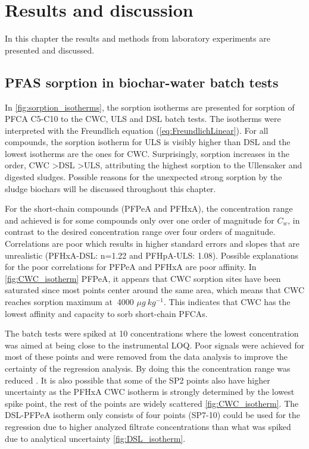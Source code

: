\chapter{Results and discussion}\label{chap:Results&Disc}
In this chapter the results and methods from laboratory experiments are presented and discussed.

\section{PFAS sorption in biochar-water batch tests}
In \cref{fig:sorption_isotherms}, the sorption isotherms are presented for sorption of PFCA C5-C10 to the CWC, ULS and DSL batch tests. The isotherms were interpreted with the Freundlich equation (\cref{eq:FreundlichLinear}). For all compounds, the sorption isotherm for ULS is visibly higher than DSL and the lowest isotherms are the ones for CWC. Surprisingly, sorption increases in the order, CWC \textgreater DSL \textgreater ULS, attributing the highest sorption to the Ullensaker and digested sludges. Possible reasons for the unexpected strong sorption by the sludge biochars will be discussed throughout this chapter. 

For the short-chain compounds (PFPeA and PFHxA), the concentration range and  achieved is for some compounds only over one order of magnitude for $C_w$, in contrast to the desired concentration range over four orders of magnitude. Correlations are poor which results in higher standard errors and slopes that are unrealistic (PFHxA-DSL: n=1.22 and PFHpA-ULS: 1.08). Possible explanations for the poor correlations for PFPeA and PFHxA are poor affinity. In \cref{fig:CWC_isotherm} PFPeA, it appears that CWC sorption sites have been saturated since most points center around the same area, which means that CWC reaches sorption maximum at $~$4000 $\mu g~kg^{-1}$.  This indicates that CWC has the lowest affinity and capacity to sorb short-chain PFCAs. 

The batch tests were spiked at 10 concentrations where the lowest concentration was aimed at being close to the instrumental LOQ. Poor signals were achieved for most of these points and were removed from the data analysis to improve the certainty of the regression analysis. By doing this the concentration range was reduced . It is also possible that some of the SP2 points also have higher uncertainty as the PFHxA CWC isotherm is strongly determined by the lowest spike point, the rest of the points are widely scattered \cref{fig:CWC_isotherm}. The DSL-PFPeA isotherm only consists of four points (SP7-10) could be used for the regression due to higher analyzed filtrate concentrations than what was spiked due to analytical uncertainty \cref{fig:DSL_isotherm}.  

